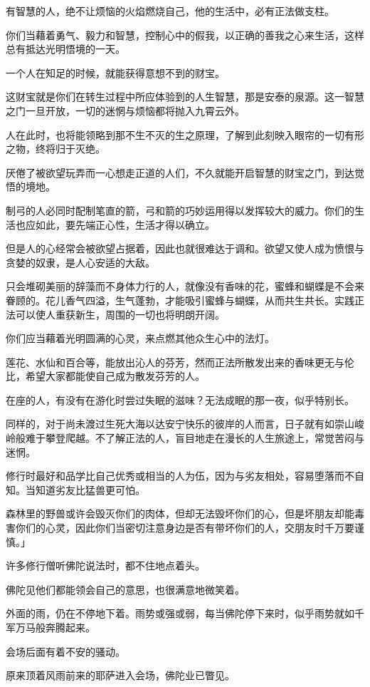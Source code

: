 \documentclass[twoside,openany]{book}
\begin{document}
有智慧的人，绝不让烦恼的火焰燃烧自己，他的生活中，必有正法做支柱。

你们当藉着勇气、毅力和智慧，控制心中的假我，以正确的善我之心来生活，这样总有抵达光明悟境的一天。

一个人在知足的时候，就能获得意想不到的财宝。

这财宝就是你们在转生过程中所应体验到的人生智慧，那是安泰的泉源。这一智慧之门一旦开放，一切的迷惘与烦恼都将抛入九霄云外。

人在此时，也将能领略到那不生不灭的生之原理，了解到此刻映入眼帘的一切有形之物，终将归于灭绝。

厌倦了被欲望玩弄而一心想走正道的人们，不久就能开启智慧的财宝之门，到达觉悟的境地。

制弓的人必同时配制笔直的箭，弓和箭的巧妙运用得以发挥较大的威力。你们的生活也应如此，要先端正心性，生活才得以确立。

但是人的心经常会被欲望占据着，因此也就很难达于调和。欲望又使人成为愤恨与贪婪的奴隶，是人心安适的大敌。

只会堆砌美丽的辞藻而不身体力行的人，就像没有香味的花，蜜蜂和蝴蝶是不会来眷顾的。花儿香气四溢，生气蓬勃，才能吸引蜜蜂与蝴蝶，从而共生共长。实践正法可以使人重获新生，周围的一切也将明朗开阔。

你们应当藉着光明圆满的心灵，来点燃其他众生心中的法灯。

莲花、水仙和百合等，能放出沁人的芬芳，然而正法所散发出来的香味更无与伦比，希望大家都能使自己成为散发芬芳的人。

在座的人，有没有在游化时尝过失眠的滋味？无法成眠的那一夜，似乎特别长。

同样的，对于尚未渡过生死大海以达安宁快乐的彼岸的人而言，日子就有如崇山峻岭般难于攀登爬越。不了解正法的人，盲目地走在漫长的人生旅途上，常觉苦闷与迷惘。

修行时最好和品学比自己优秀或相当的人为伍，因为与劣友相处，容易堕落而不自知。当知道劣友比猛兽更可怕。

森林里的野兽或许会毁灭你们的肉体，但却无法毁坏你们的心，但是坏朋友却能毒害你们的心灵，因此你们当密切注意身边是否有带坏你们的人，交朋友时千万要谨慎。」

许多修行僧听佛陀说法时，都不住地点着头。

佛陀见他们都能领会自己的意思，也很满意地微笑着。

外面的雨，仍在不停地下着。雨势或强或弱，每当佛陀停下来时，似乎雨势就如千军万马般奔腾起来。

会场后面有着不安的骚动。

原来顶着风雨前来的耶萨进入会场，佛陀业已瞥见。
\end{document}
